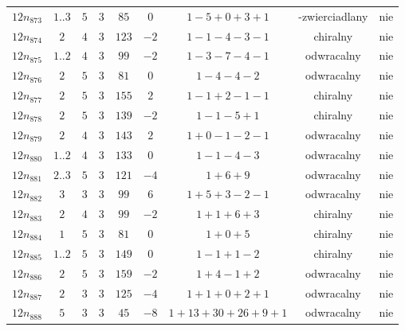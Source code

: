 \begin{longtable}{ccccccccc}
$12n_{873}$ & $1..3$ & $5$ & $3$ & $85$ & $0$ & $1-5+0+3+1$ & -zwierciadlany & nie \\
$12n_{874}$ & $2$ & $4$ & $3$ & $123$ & $-2$ & $1-1-4-3-1$ & chiralny & nie \\
$12n_{875}$ & $1..2$ & $4$ & $3$ & $99$ & $-2$ & $1-3-7-4-1$ & odwracalny & nie \\
$12n_{876}$ & $2$ & $5$ & $3$ & $81$ & $0$ & $1-4-4-2$ & odwracalny & nie \\
$12n_{877}$ & $2$ & $5$ & $3$ & $155$ & $2$ & $1-1+2-1-1$ & chiralny & nie \\
$12n_{878}$ & $2$ & $5$ & $3$ & $139$ & $-2$ & $1-1-5+1$ & chiralny & nie \\
$12n_{879}$ & $2$ & $4$ & $3$ & $143$ & $2$ & $1+0-1-2-1$ & odwracalny & nie \\
$12n_{880}$ & $1..2$ & $4$ & $3$ & $133$ & $0$ & $1-1-4-3$ & odwracalny & nie \\
$12n_{881}$ & $2..3$ & $5$ & $3$ & $121$ & $-4$ & $1+6+9$ & odwracalny & nie \\
$12n_{882}$ & $3$ & $3$ & $3$ & $99$ & $6$ & $1+5+3-2-1$ & odwracalny & nie \\
$12n_{883}$ & $2$ & $4$ & $3$ & $99$ & $-2$ & $1+1+6+3$ & chiralny & nie \\
$12n_{884}$ & $1$ & $5$ & $3$ & $81$ & $0$ & $1+0+5$ & chiralny & nie \\
$12n_{885}$ & $1..2$ & $5$ & $3$ & $149$ & $0$ & $1-1+1-2$ & chiralny & nie \\
$12n_{886}$ & $2$ & $5$ & $3$ & $159$ & $-2$ & $1+4-1+2$ & odwracalny & nie \\
$12n_{887}$ & $2$ & $3$ & $3$ & $125$ & $-4$ & $1+1+0+2+1$ & odwracalny & nie \\
$12n_{888}$ & $5$ & $3$ & $3$ & $45$ & $-8$ & $1+13+30+26+9+1$ & odwracalny & nie \\
\hline
\end{longtable}
\normalsize
